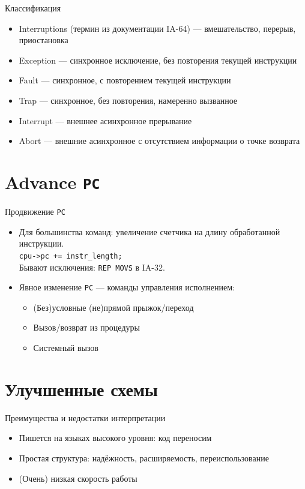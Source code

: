 \documentclass{beamer}
\begin{document}
\begin{frame}{Классификация} %
\begin{itemize}
\item Interruptions (термин из документации IA-64) — вмешательство, перерыв, приостановка
\item Exception — синхронное исключение, без повторения текущей инструкции
\item Fault — синхронное, с повторением текущей инструкции
\item Trap — синхронное, без повторения, намеренно вызванное
\item Interrupt — внешнее асинхронное прерывание
\item Abort — внешние асинхронное с отсутствием информации о точке возврата
\end{itemize}
\end{frame}

\section{Advance \texttt{PC}}

\begin{frame}{Продвижение \texttt{PC}}

\begin{itemize}
    \item Для большинства команд: увеличение счетчика на длину обработанной инструкции.\\
    \texttt{cpu->pc += instr_length;}\\
    \pause{}Бывают исключения: \texttt{REP MOVS} в IA-32.\pause
    \item Явное изменение \texttt{PC} — команды управления исполнением:
    \begin{itemize}
        \item (Без)условные (не)прямой прыжок/переход
        \item Вызов/возврат из процедуры
        \item Системный вызов
    \end{itemize}
\end{itemize}

\end{frame}

\section{Улучшенные схемы}

\begin{frame}{Преимущества и недостатки интерпретации}
\begin{itemize}
\item Пишется на языках высокого уровня: код переносим
\item Простая структура: надёжность, расширяемость, переиспользование
\end{itemize}
\pause
\begin{itemize}
\item (Очень) низкая скорость работы
\end{itemize}
\end{frame}
\end{document}
